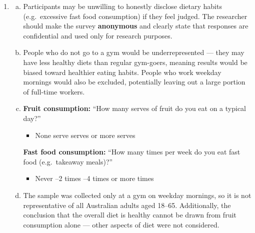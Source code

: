 \documentclass{article}
\begin{document}
\begin{enumerate}
  \item
  \begin{enumerate}[(a)]
    \item Participants may be unwilling to honestly disclose dietary habits (e.g.\ excessive
    fast food consumption) if they feel judged. The researcher should make the survey
    \textbf{anonymous} and clearly state that responses are confidential and used only for
    research purposes.
    \item People who do not go to a gym would be underrepresented --- they may have less
    healthy diets than regular gym-goers, meaning results would be biased toward healthier
    eating habits. People who work weekday mornings would also be excluded, potentially
    leaving out a large portion of full-time workers.
    \item \textbf{Fruit consumption:} ``How many serves of fruit do you eat on a typical day?''
    \begin{itemize}
      \item None  serve  serves  or more serves
    \end{itemize}
    \textbf{Fast food consumption:} ``How many times per week do you eat fast food (e.g.\
    takeaway meals)?''
    \begin{itemize}
      \item Never --2 times --4 times  or more times
    \end{itemize}
    \item The sample was collected only at a gym on weekday mornings, so it is not
    representative of all Australian adults aged 18--65. Additionally, the conclusion that
    the overall diet is healthy cannot be drawn from fruit consumption alone --- other aspects
    of diet were not considered.
  \end{enumerate}

\end{enumerate}
\end{document}

